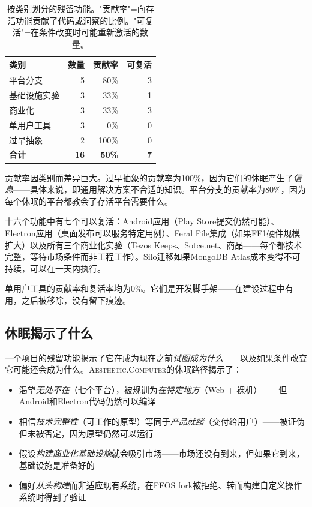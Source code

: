\documentclass[10pt,letterpaper,twocolumn]{article}
\newcommand{\ac}{\textsc{Aesthetic.Computer}}
\begin{document}
\begin{table}[h]
\small
\centering
\begin{tabularx}{\columnwidth}{Xrrr}
\toprule
\textbf{类别} & \textbf{数量} & \textbf{贡献率} & \textbf{可复活} \\
\midrule
平台分支 & 5 & 80\% & 3 \\
基础设施实验 & 3 & 33\% & 1 \\
商业化 & 3 & 33\% & 3 \\
单用户工具 & 3 & 0\% & 0 \\
过早抽象 & 2 & 100\% & 0 \\
\midrule
\textbf{合计} & \textbf{16} & \textbf{50\%} & \textbf{7} \\
\bottomrule
\end{tabularx}
\caption{按类别划分的残留功能。"贡献率"=向存活功能贡献了代码或洞察的比例。"可复活"=在条件改变时可能重新激活的数量。}
\label{tab:vestigial}
\end{table}

贡献率因类别而差异巨大。过早抽象的贡献率为100\%，因为它们的休眠产生了\emph{信息}——具体来说，即通用解决方案不合适的知识。平台分支的贡献率为80\%，因为每个休眠的平台都教会了存活平台需要什么。

十六个功能中有七个可以复活：Android应用（Play Store提交仍然可能）、Electron应用（桌面发布可以服务特定用例）、Feral File集成（如果FF1硬件规模扩大）以及所有三个商业化实验（Tezos Keeps、Sotce.net、商品——每个都技术完整，等待市场条件而非工程工作）。Silo迁移如果MongoDB Atlas成本变得不可持续，可以在一天内执行。

单用户工具的贡献率和复活率均为0\%。它们是开发脚手架——在建设过程中有用，之后被移除，没有留下痕迹。

\subsection{休眠揭示了什么}

一个项目的残留功能揭示了它在成为现在之前\emph{试图成为什么}——以及如果条件改变它可能还会成为什么。\ac{}的休眠路径揭示了：

\begin{itemize}
  \item 渴望\emph{无处不在}（七个平台），被规训为\emph{在特定地方}（Web + 裸机）——但Android和Electron代码仍然可以编译
  \item 相信\emph{技术完整性}（可工作的原型）等同于\emph{产品就绪}（交付给用户）——被证伪但未被否定，因为原型仍然可以运行
  \item 假设\emph{构建商业化基础设施}就会吸引市场——市场还没有到来，但如果它到来，基础设施是准备好的
  \item 偏好\emph{从头构建}而非适应现有系统，在FFOS fork被拒绝、转而构建自定义操作系统时得到了验证
\end{itemize}
\end{document}
